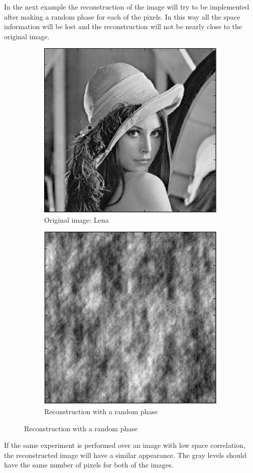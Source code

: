 \documentclass[a4paper, 10pt, conference] {article}
\begin{document}
In the next example the reconstruction of the image will try to be implemented after making a random phase for each of the pixels. In this way all the space information will be lost and the reconstruction will not be nearly close to the original image.
\begin{figure}[H]
	\centering
	\begin{subfigure}{0.49\textwidth} 
		\centering						
		\includegraphics[scale=0.5]{reportImages/exp1_lena.PNG}
		\caption{Original image: Lena}
	\end{subfigure}
	\begin{subfigure}{0.49\textwidth}
		\centering
		\includegraphics[scale=0.5]{reportImages/exp1_random_phase.PNG}
		\caption{Reconstruction with a random phase}
	\end{subfigure}
	\label{exp1_1}
\end{figure}
If the same experiment is performed over an image with low space correlation, the reconstructed image will have a similar appearance. The gray levels should have the same number of pixels for both of the images.
\end{document}
